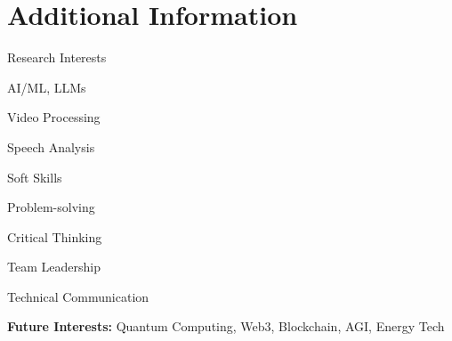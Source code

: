 \documentclass[10pt, letterpaper]{article}
\begin{document}
\section{Additional Information}
\begin{minipage}{\linewidth}
\begin{multicols}{2}
    \begin{skillsection}{Research Interests}
        \item AI/ML, LLMs
        \item Video Processing
        \item Speech Analysis
    \end{skillsection}
    
    \columnbreak
    \begin{skillsection}{Soft Skills}
        \item Problem-solving
        \item Critical Thinking
        \item Team Leadership
        \item Technical Communication
    \end{skillsection}
\end{multicols}

\textbf{Future Interests:} Quantum Computing, Web3, Blockchain, AGI, Energy Tech
\end{minipage}
\end{document}
